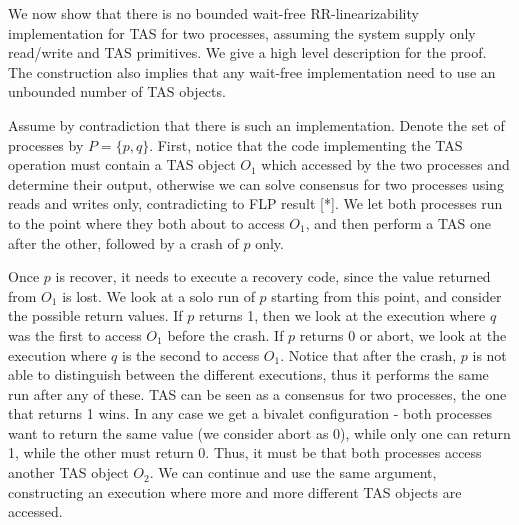 \documentclass{article}
\begin{document}
We now show that there is no bounded wait-free RR-linearizability implementation for TAS for two processes, assuming the system supply only read/write and TAS primitives. We give a high level description for the proof. The construction also implies that any wait-free implementation need to use an unbounded number of TAS objects.

Assume by contradiction that there is such an implementation. Denote the set of processes by $P=\{p,q\}$. First, notice that the code implementing the TAS operation must contain a TAS object $O_1$ which accessed by the two processes and determine their output, otherwise we can solve consensus for two processes using reads and writes only, contradicting to FLP result [*]. We let both processes run to the point where they both about to access $O_1$, and then perform a TAS one after the other, followed by a crash of $p$ only.

Once $p$ is recover, it needs to execute a recovery code, since the value returned from $O_1$ is lost. We look at a solo run of $p$ starting from this point, and consider the possible return values. If $p$ returns 1, then we look at the execution where $q$ was the first to access $O_1$ before the crash. If $p$ returns 0 or abort, we look at the execution where $q$ is the second to access $O_1$. Notice that after the crash, $p$ is not able to distinguish between the different executions, thus it performs the same run after any of these. TAS can be seen as a consensus for two processes, the one that returns 1 wins. In any case we get a bivalet configuration - both processes want to return the same value (we consider abort as 0), while only one can return 1, while the other must return 0. Thus, it must be that both processes access another TAS object $O_2$. We can continue and use the same argument, constructing an execution where more and more different TAS objects are accessed.





\end{document}
